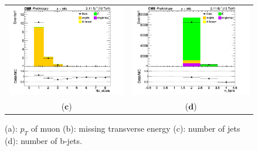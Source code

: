\documentclass{cmspaper}
\begin{document}
\begin{figure}[htp]
\begin{tabular}{cc}
\includegraphics[scale=0.40]{results/No_ofJets.png}
& \hspace{-0.5cm} \includegraphics[scale=0.40]{results/n_bJets.png}\\
   ($\mathbf{c}$)\qquad\qquad&($\mathbf{d}$)\qquad\qquad\qquad\\
\end{tabular}
\caption{(a): $p_{T}$ of muon (b): missing transverse energy (c): number of jets (d): number of b-jets.}\label{muon}
\end{figure}
\end{document}
